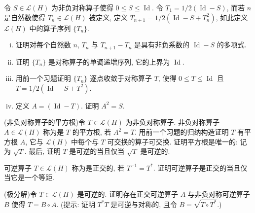 \documentclass[../../main.tex]{subfiles}
\begin{document}
\begin{exercise}\label{exercise:ch16-40}
令 $S\in\mathcal{L}(H)$ 为非负对称算子使得 $0\leqslant S\leqslant\operatorname{Id}$. 令 $T_{1}=1/2(\operatorname{Id}-S)$, 而若 $n$ 是自然数使得 $T_{n}\in\mathcal{L}(H)$ 被定义, 定义 $T_{n+1}=1/2(\operatorname{Id}-S+T_{n}^{2})$, 如此定义 $\mathcal{L}(H)$ 中的算子序列 $\{T_{n}\}$.
\begin{enumerate}[(i)]
\item 证明对每个自然数 $n$, $T_{n}$ 与 $T_{n+1}-T_{n}$ 是具有非负系数的 $\operatorname{Id}-S$ 的多项式.
\item 证明 $\{T_{n}\}$ 是对称算子的单调递增序列, 它的上界为 $\operatorname{Id}$.
\item 用前一个习题证明 $\{T_{n}\}$ 逐点收敛于对称算子 $T$, 使得 $0\leqslant T\leqslant\operatorname{Id}$ 且 $T=1/2(\operatorname{Id}-S+T^{2})$.
\item 定义 $A=(\operatorname{Id}-T)$. 证明 $A^{2}=S$.
\end{enumerate}
\end{exercise}

\begin{exercise}\label{exercise:ch16-41}
(非负对称算子的平方根)令 $T\in\mathcal{L}(H)$ 为非负对称算子. 非负对称算子 $A\in\mathcal{L}(H)$ 称为是 $T$ 的平方根, 若 $A^{2}=T$. 用前一个习题的归纳构造证明 $T$ 有平方根 $A$, 它与 $\mathcal{L}(H)$ 中每个与 $T$ 可交换的算子可交换. 证明平方根是唯一的: 记为 $\sqrt{T}$. 最后, 证明 $T$ 是可逆的当且仅当 $\sqrt{T}$ 是可逆的.
\end{exercise}

\begin{exercise}\label{exercise:ch16-42}
可逆算子 $T\in\mathcal{L}(H)$ 称为是正交的, 若 $T^{-1}=T^{*}$. 证明可逆算子是正交的当且仅当它是一个等距.
\end{exercise}

\begin{exercise}\label{exercise:ch16-43}
(极分解)令 $T\in\mathcal{L}(H)$ 是可逆的. 证明存在正交可逆算子 $A$ 与非负对称可逆算子 $B$ 使得 $T=B\circ A$. (提示: 证明 $T^{*}T$ 是可逆与对称的, 且令 $B=\sqrt{T\circ T^{*}}$.)
\end{exercise}
\end{document}
